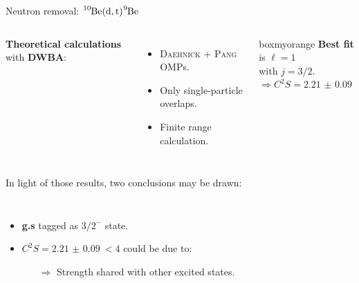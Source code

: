 \documentclass[sans,
frameno, %
mp,
usenames,dvipsnames, %
onlytextwidth, %
t,%
11pt]{beamer}
\newcommand{\notice}[1]{\textbf{\alert{#1}}}
\newcommand{\iso}[2]{\ce{^{#1}#2}}
\begin{document}
\begin{frame}{Neutron removal: $\iso{10}{Be}(\textrm{d}, \textrm{t})\iso{9}{Be}$}
{\begin{figure}
\begin{minipage}[t]{0.48\linewidth}
            \end{minipage}
        \end{figure}
        \medskip
        \begin{columns}
            {
                \notice{Theoretical calculations} with \textbf{DWBA}:
                \begin{itemize}
                    \item \textsc{Daehnick} + \textsc{Pang} OMPs.
                    \item Only single-particle overlaps.
                    \item Finite range calculation.
                \end{itemize}
            }\hfill
            {

                \begin{beamercolorbox}[sep=1ex, center, rounded=true]{boxmyorange}
                    \textbf{Best fit} is $\ell = 1$\\
                    with $j = 3/2$.\\
                    $\Rightarrow C^2S = \qty{2.21(9)}{}$
                \end{beamercolorbox}

            }
        \end{columns}

    }
    \only<+>
    {
        \addtocounter{framenumber}{1}
        In light of those results, two conclusions may be drawn:

        \bigskip
        \begin{columns}[c]
            {
                \begin{itemize}
                    \setlength\itemsep{1em}
                    \item \iso{9}{Be} \textbf{g.s} tagged as $3/2^{-}$ state.
                    \item $C^2S = \qty{2.21(9)}{} < 4$ could be due to:

                          \bigskip
                          \begin{itemize}
                              \setlength\itemsep{1em}
                              \item[$\Rightarrow$] Strength shared with other excited states.


\end{itemize}
\end{itemize}}
\end{columns}}
\end{frame}
\end{document}
